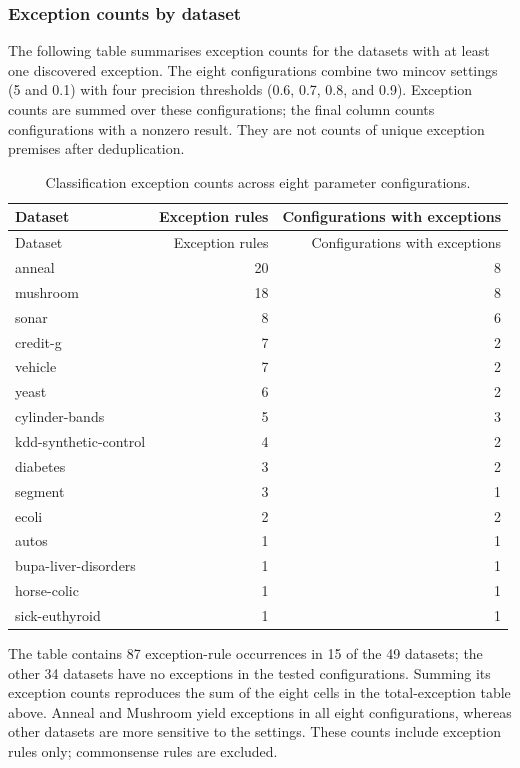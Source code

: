 \subsubsection{Exception counts by dataset}
\label{classification-counts-by-dataset}
The following table summarises exception counts for the datasets
with at least one discovered exception. The eight
configurations combine two mincov settings (5 and 0.1) with four precision
thresholds (0.6, 0.7, 0.8, and 0.9). Exception counts are summed over these
configurations; the final column counts configurations with a nonzero result.
They are not counts of unique exception premises after deduplication.

\begin{longtable}{@{}lrr@{}}
\caption{Classification exception counts across eight parameter configurations.}
\label{tab:classification-counts-by-dataset}\\
\toprule
Dataset & Exception rules & Configurations with exceptions \\
\midrule
\endfirsthead
\toprule
Dataset & Exception rules & Configurations with exceptions \\
\midrule
\endhead
anneal & 20 & 8 \\
mushroom & 18 & 8 \\
sonar & 8 & 6 \\
credit-g & 7 & 2 \\
vehicle & 7 & 2 \\
yeast & 6 & 2 \\
cylinder-bands & 5 & 3 \\
kdd-synthetic-control & 4 & 2 \\
diabetes & 3 & 2 \\
segment & 3 & 1 \\
ecoli & 2 & 2 \\
autos & 1 & 1 \\
bupa-liver-disorders & 1 & 1 \\
horse-colic & 1 & 1 \\
sick-euthyroid & 1 & 1 \\
\bottomrule
\end{longtable}

The table contains 87 exception-rule occurrences in 15 of the 49 datasets;
the other 34 datasets have no exceptions in the tested configurations.
Summing its exception counts reproduces the sum of the eight cells in the
total-exception table above. Anneal and Mushroom yield exceptions in all eight
configurations, whereas other datasets are more sensitive to the settings.
These counts include exception rules only; commonsense rules are excluded.


